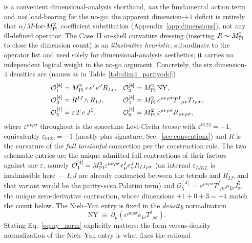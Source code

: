 \documentclass[aps,prd,twocolumn,superscriptaddress,showpacs,preprintnumbers,nofootinbib,longbibliography,floatfix]{revtex4-2}
\newcommand{\MPl}{M_{\rm Pl}}
\begin{document}
is a convenient dimensional-analysis shorthand, \emph{not} the
fundamental action term and \emph{not} load-bearing for the no-go: the
apparent dimension-$+1$ deficit is entirely that
$\alpha/M$-for-$\MPl^{2}$ coefficient substitution
(Appendix~\ref{app:dimensions}), not any ill-defined operator. The Case~II on-shell curvature dressing
(inserting $R\sim\MPl^2$ to close the dimension count) is an
\emph{illustrative heuristic}, subordinate to the operator list and used
solely for dimensional-analysis aesthetics; it carries no independent
logical weight in the no-go argument.
Concretely, the six dimension-$4$ densities are (names as in
Table~\ref{tab:dim4_parityodd})
\begin{align}\label{eq:dim4_defs}
\mathcal{O}_{1}^{[4]}&=\MPl^{2}\,\varepsilon\,e^I e^J R_{IJ},
& \mathcal{O}_{2}^{[4]}&=\MPl^{2}\,\mathrm{NY},\notag\\
\mathcal{O}_{3}^{[4]}&=R^{IJ}\!\wedge R_{IJ},
& \mathcal{O}_{4}^{[4]}&=\MPl^{2}\,\varepsilon^{\mu\nu\rho\sigma}T^{I}{}_{\mu\nu}T_{I\rho\sigma},\notag\\
\mathcal{O}_{5}^{[4]}&=\varepsilon\,T\,e\,J^5,
& \mathcal{O}_{6}^{[4]}&=\MPl^{2}\,\varepsilon^{\mu\nu\rho\sigma}R_{\mu\nu\rho\sigma},
\end{align}
where $\varepsilon^{\mu\nu\rho\sigma}$ throughout is the spacetime
Levi-Civita \emph{tensor} with $\varepsilon^{0123}=+1$, equivalently
$\varepsilon_{0123}=-1$ (mostly-plus signature,
Sec.~\ref{sec:conventions}) and $R$ is the curvature of the \emph{full
torsionful} connection per the construction rule. The two schematic
entries are the unique admitted full contractions of their factors
against one $\varepsilon$, namely
$\mathcal{O}_1^{[4]}=\MPl^2\varepsilon^{\mu\nu\rho\sigma}
e^I_\mu e^J_\nu R_{IJ\rho\sigma}$
(an internal $\varepsilon_{IJKL}$ is inadmissible here --- $I,J$ are
already contracted between the tetrads and $R_{IJ}$, and that variant
would be the parity-\emph{even} Palatini term) and
$\mathcal{O}_5^{[4]}=\varepsilon^{\mu\nu\rho\sigma}
T^{I}{}_{\mu\nu}e_{I\rho}J^5_\sigma$, the unique zero-derivative
contraction, whose dimensions $+1+0+3=+4$ match the count below. The
Nieh--Yan entry
is fixed in the \emph{density} normalization
\begin{equation}\label{eq:ny_norm}
\mathrm{NY}\;\equiv\;\partial_\mu\!\left(\varepsilon^{\mu\nu\rho\sigma}
e_{I\nu}T^{I}{}_{\rho\sigma}\right).
\end{equation}
Stating Eq.~\eqref{eq:ny_norm} explicitly matters: the form-versus-density
normalization of the Nieh--Yan entry is what fixes the rational
\end{document}
